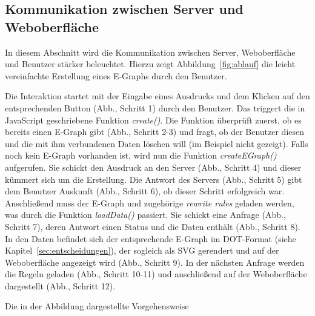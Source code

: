 \subsection{Kommunikation zwischen Server und Weboberfläche}


In diesem Abschnitt wird die Kommunikation zwischen Server, Weboberfläche und Benutzer stärker beleuchtet.
Hierzu zeigt Abbildung~\ref{fig:ablauf} die leicht vereinfachte Erstellung eines E-Graphs durch den Benutzer.


Die Interaktion startet mit der Eingabe eines Ausdrucks und dem Klicken auf den entsprechenden Button (Abb., Schritt 1) durch den Benutzer.
Das triggert die in JavaScript geschriebene Funktion \textit{create()}. 
Die Funktion überprüft zuerst, ob es bereits einen E-Graph gibt (Abb., Schritt 2-3) und fragt, ob der Benutzer
diesen und die mit ihm verbundenen Daten löschen will (im Beispiel nicht gezeigt). 
Falls noch kein E-Graph vorhanden ist, wird nun die Funktion \textit{createEGraph()} aufgerufen. 
Sie schickt den Ausdruck an den Server (Abb., Schritt 4) und dieser kümmert sich um die Erstellung. Die Antwort des Servers (Abb., Schritt 5) gibt dem Benutzer 
Auskunft (Abb., Schritt 6), ob dieser Schritt erfolgreich war. 
Anschließend muss der E-Graph und zugehörige \textit{rewrite rules} geladen werden, was durch die Funktion \textit{loadData()} passiert.
Sie schickt eine Anfrage (Abb., Schritt 7), deren Antwort einen Status und die Daten enthält (Abb., Schritt 8). In den Daten befindet sich der entsprechende E-Graph im 
DOT-Format (siehe Kapitel~\ref{sec:entscheidungen}), der sogleich als SVG gerendert und auf der Weboberfläche angezeigt wird (Abb., Schritt 9).
In der nächsten Anfrage werden die Regeln geladen (Abb., Schritt 10-11) und anschließend auf der Weboberfläche dargestellt (Abb., Schritt 12).

Die in der Abbildung dargestellte Vorgehensweise

